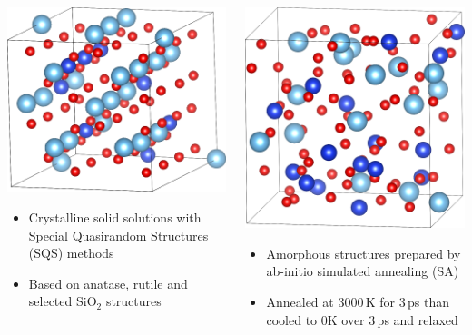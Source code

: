 \documentclass[noamsthm,8pt,t]{beamer}
\begin{document}
\begin{frame}
   \begin{columns}
      \begin{column}{0.5\textwidth}
         \begin{center}
             \includegraphics[width=0.6\linewidth]{figures/SQS.png}
         \end{center}
         \begin{itemize}
            \item Crystalline solid solutions with Special Quasirandom Structures (SQS) methods
            \item Based on anatase, rutile and selected SiO$_2$ structures
         \end{itemize}
      \end{column}

      \pause

      \begin{column}{0.5\textwidth}
         \begin{center}
            \includegraphics[width=0.5\linewidth]{figures/am-SA.png}
         \end{center}
         \begin{itemize}
            \item Amorphous structures prepared by ab-initio simulated annealing (SA)
            \item Annealed at 3000\,K for 3\,ps than cooled to 0K over 3\,ps and relaxed
         \end{itemize}
      \end{column}
   \end{columns}
\end{frame}
\end{document}
